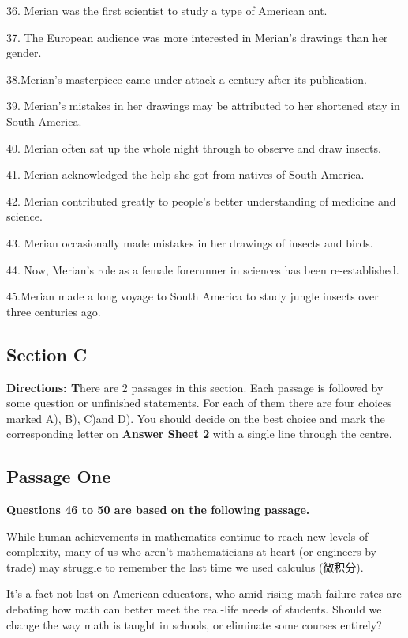 \documentclass[UTF8,11pt]{ctexart}
\begin{document}
36. Merian was the first scientist to study a type of American ant.


37. The European audience was more interested in Merian's drawings than her gender.


38.Merian's masterpiece came under attack a century after its publication.


39. Merian’s mistakes in her drawings may be attributed to her shortened stay in South America.


40. Merian often sat up the whole night through to observe and draw insects.


41. Merian acknowledged the help she got from natives of South America.


42. Merian contributed greatly to people's better understanding of medicine and science.


43. Merian occasionally made mistakes in her drawings of insects and birds.


44. Now, Merian's role as a female forerunner in sciences has been re-established.


45.Merian made a long voyage to South America to study jungle insects over three centuries ago.


\subsection*{\textbf{Section C}}


\textbf{Directions: T}here are 2 passages in this section. Each passage is followed by some question or unfinished statements. For each of them there are four choices marked A), B), C)and D). You should decide on the best choice and mark the corresponding letter on\textbf{ Answer Sheet 2} with a single line through the centre.


\subsection*{\textbf{Passage One}}


\textbf{Questions 46 to 50 are based on the following passage.}


While human achievements in mathematics continue to reach new levels of complexity, many of us who aren't mathematicians at heart (or engineers by trade) may struggle to remember the last time we used calculus (微积分).


It’s a fact not lost on American educators, who amid rising math failure rates are debating how math can better meet the real-life needs of students. Should we change the way math is taught in schools, or eliminate some courses entirely?
\end{document}
